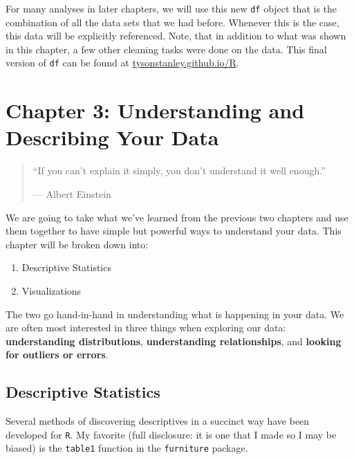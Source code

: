 \documentclass[]{tufte-book}
\providecommand{\tightlist}{%
  \setlength{\itemsep}{0pt}\setlength{\parskip}{0pt}}
\theoremstyle{definition}
\theoremstyle{definition}
\theoremstyle{remark}
\begin{document}
For many analyses in later chapters, we will use this new \texttt{df}
object that is the combination of all the data sets that we had before.
Whenever this is the case, this data will be explicitly referenced.
Note, that in addition to what was shown in this chapter, a few other
cleaning tasks were done on the data. This final version of \texttt{df}
can be found at
\href{http://www.tysonstanley.github.io/R}{tysonstanley.github.io/R}.

\chapter*{Chapter 3: Understanding and Describing Your
Data}\label{chapter-3-understanding-and-describing-your-data}

\begin{quote}
``If you can't explain it simply, you don't understand it well enough.''

--- Albert Einstein
\end{quote}

We are going to take what we've learned from the previous two chapters
and use them together to have simple but powerful ways to understand
your data. This chapter will be broken down into:

\begin{enumerate}
\def\labelenumi{\arabic{enumi}.}
\tightlist
\item
  Descriptive Statistics
\item
  Visualizations
\end{enumerate}

The two go hand-in-hand in understanding what is happening in your data.
We are often most interested in three things when exploring our data:
\textbf{understanding distributions}, \textbf{understanding
relationships}, and \textbf{looking for outliers or errors}.

\section*{Descriptive Statistics}\label{descriptive-statistics}

Several methods of discovering descriptives in a succinct way have been
developed for \texttt{R}. My favorite (full disclosure: it is one that I
made so I may be biased) is the \texttt{table1} function in the
\texttt{furniture} package.
\end{document}
